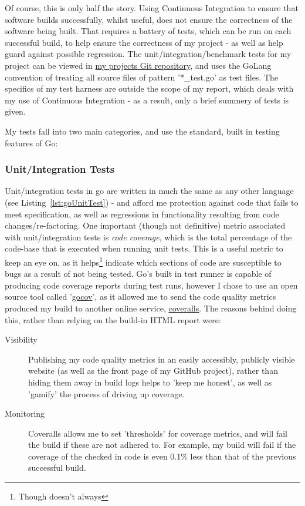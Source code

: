 Of course, this is only half the story. Using Continuous Integration to ensure
that software builds successfully, whilst useful, does not ensure the correctness
of the software being built. That requires a battery of tests, which can be run
on each successful build, to help ensure the correctness of my project - as well
as help guard against possible regression. The unit/integration/benchmark tests
for my project can be viewed in
\href{https://github.com/FireEater64/gamq}{my projects Git repository}, and uses
the GoLang convention of treating all source files of pattern '*\_test.go' as test
files. The specifics of my test harness are outside the scope of my report, which
deals with my use of Continuous Integration - as a result, only a brief summery of
tests is given.

My tests fall into two main categories, and use the standard, built in testing
features of Go:

\subsubsection{Unit/Integration Tests}
\label{subs:Unit/Integration Tests}

Unit/integration tests in go are written in much the same as any other language
(see Listing~\ref{lst:goUnitTest}) - and afford me protection against code that
fails to meet specification, as well as regressions in functionality resulting
from code changes/re-factoring. One important (though not definitive) metric
associated with unit/integration tests is \emph{code coverage}, which is the
total percentage of the code-base that is executed when running unit tests. This
is a useful metric to keep an eye on, as it helps\footnote{Though doesn't always}
indicate which sections of code are susceptible to bugs as a result of not being
tested. Go's built in test runner is capable of producing code coverage reports
during test runs, however I chose to use an open source tool called '\href{}{gocov}',
as it allowed me to send the code quality metrics produced my build to another
online service, \href{https://coveralls.io/}{coveralls}. The reasons behind doing
this, rather than relying on the build-in HTML report were:

\begin{description}
  \item[Visibility] Publishing my code quality metrics in an easily accessibly,
  publicly visible website (as well as the front page of my GitHub project),
  rather than hiding them away in build logs helps to
  'keep me honest', as well as 'gamify' the process of driving up coverage.
  \item[Monitoring] Coveralls allows me to set 'thresholds' for coverage metrics,
  and will fail the build if these are not adhered to. For example, my build will
  fail if the coverage of the checked in code is even 0.1\% less than that of the
  previous successful build.
\end{description}

